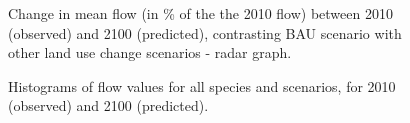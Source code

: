 
\begin{figure}[h!]
 \caption{Change in mean flow (in \% of the the 2010 flow) between 2010 (observed) and 2100 (predicted), contrasting BAU scenario with other land use change scenarios - radar graph.}
 \label{fig:flow_radar_1}
\end{figure}


\begin{figure}[h!]
 \caption{Histograms of flow values for all species and scenarios, for 2010 (observed) and 2100 (predicted).}
 \label{fig:hist_1}
\end{figure}


